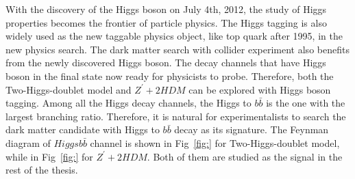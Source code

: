 \par With the discovery of the Higgs boson\cite{Aad:2012tfa}\cite{Chatrchyan:2012xdj} on July 4th, 2012, the study of Higgs properties becomes the frontier of particle physics. The Higgs tagging is also widely used as the new taggable physics object, like top quark after 1995, in the new physics search. The dark matter search with collider experiment also benefits from the newly discovered Higgs boson. The decay channels that have Higgs boson in the final state now ready for physicists to probe. Therefore, both the Two-Higgs-doublet model and $Z^{\prime}+2HDM$ can be explored with Higgs boson tagging. Among all the Higgs decay channels, the Higgs to $b\bar{b}$ is the one with the largest branching ratio. Therefore, it is natural for experimentalists to search the dark matter candidate with Higgs to $b\bar{b}$ decay as its signature. The Feynman diagram of $Higgs b\bar{b}$ channel is shown in Fig~\ref{fig:} for Two-Higgs-doublet model, while in Fig~\ref{fig:} for $Z^{\prime}+2HDM$. Both of them are studied as the signal in the rest of the thesis.
